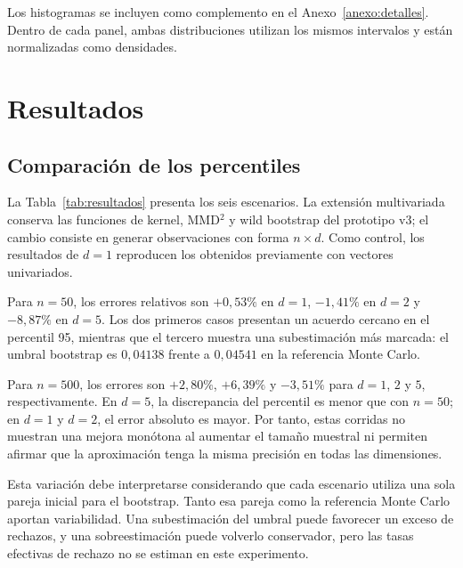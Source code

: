 \documentclass[11pt,a4paper]{article}
\begin{document}
Los histogramas se incluyen como complemento en el Anexo~\ref{anexo:detalles}. Dentro de cada panel, ambas distribuciones utilizan los mismos intervalos y están normalizadas como densidades.

\section{Resultados}
\subsection{Comparación de los percentiles}
La Tabla~\ref{tab:resultados} presenta los seis escenarios. La extensión multivariada conserva las funciones de kernel, MMD$^2$ y wild bootstrap del prototipo v3; el cambio consiste en generar observaciones con forma $n\times d$. Como control, los resultados de $d=1$ reproducen los obtenidos previamente con vectores univariados.
\begin{table}[htbp]
\centering

\caption{Percentiles 95 para normales i.i.d. con $n$ observaciones por grupo y dimensión $d$. Se utilizan $R=B=1000$ y semilla 42 en cada escenario. Los errores se calculan antes de redondear los percentiles.}
\label{tab:resultados}
\end{table}

Para $n=50$, los errores relativos son $+0{,}53\%$ en $d=1$, $-1{,}41\%$ en $d=2$ y $-8{,}87\%$ en $d=5$. Los dos primeros casos presentan un acuerdo cercano en el percentil 95, mientras que el tercero muestra una subestimación más marcada: el umbral bootstrap es $0{,}04138$ frente a $0{,}04541$ en la referencia Monte Carlo.

Para $n=500$, los errores son $+2{,}80\%$, $+6{,}39\%$ y $-3{,}51\%$ para $d=1$, $2$ y $5$, respectivamente. En $d=5$, la discrepancia del percentil es menor que con $n=50$; en $d=1$ y $d=2$, el error absoluto es mayor. Por tanto, estas corridas no muestran una mejora monótona al aumentar el tamaño muestral ni permiten afirmar que la aproximación tenga la misma precisión en todas las dimensiones.

Esta variación debe interpretarse considerando que cada escenario utiliza una sola pareja inicial para el bootstrap. Tanto esa pareja como la referencia Monte Carlo aportan variabilidad. Una subestimación del umbral puede favorecer un exceso de rechazos, y una sobreestimación puede volverlo conservador, pero las tasas efectivas de rechazo no se estiman en este experimento.
\end{document}
